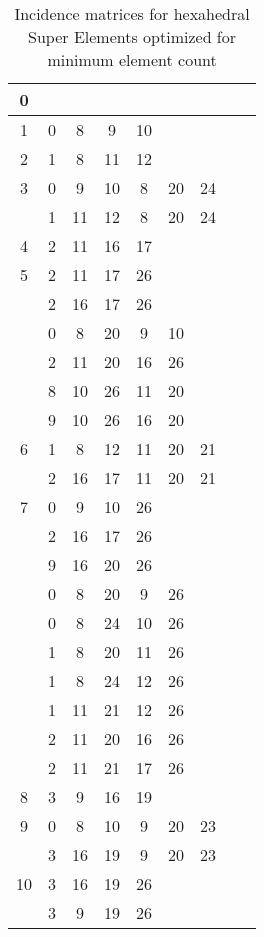 \begin{table}[H]
\centering
\caption{Incidence matrices for hexahedral Super Elements optimized for minimum element count}
\label{tab:inz_matricis_hex_minElements}
\begin{tabular}{|c|cccccccc|}\hline
0 & & & & & & & & \\
\hline
1  & 0 & 8 & 9 & 10 &   &   &   &  \\
\hline
2  & 1 & 8 & 11 & 12 &   &   &   &  \\
\hline
3  & 0 & 9 & 10 & 8 & 20 & 24 &   &  \\
 & 1 & 11 & 12 & 8 & 20 & 24 &   &  \\
\hline
4  & 2 & 11 & 16 & 17 &   &   &   &  \\
\hline
5  & 2 & 11 & 17 & 26 &   &   &   &  \\
 & 2 & 16 & 17 & 26 &   &   &   &  \\
 & 0 & 8 & 20 & 9 & 10 &   &   &  \\
 & 2 & 11 & 20 & 16 & 26 &   &   &  \\
 & 8 & 10 & 26 & 11 & 20 &   &   &  \\
 & 9 & 10 & 26 & 16 & 20 &   &   &  \\
\hline
6  & 1 & 8 & 12 & 11 & 20 & 21 &   &  \\
 & 2 & 16 & 17 & 11 & 20 & 21 &   &  \\
\hline
7  & 0 & 9 & 10 & 26 &   &   &   &  \\
 & 2 & 16 & 17 & 26 &   &   &   &  \\
 & 9 & 16 & 20 & 26 &   &   &   &  \\
 & 0 & 8 & 20 & 9 & 26 &   &   &  \\
 & 0 & 8 & 24 & 10 & 26 &   &   &  \\
 & 1 & 8 & 20 & 11 & 26 &   &   &  \\
 & 1 & 8 & 24 & 12 & 26 &   &   &  \\
 & 1 & 11 & 21 & 12 & 26 &   &   &  \\
 & 2 & 11 & 20 & 16 & 26 &   &   &  \\
 & 2 & 11 & 21 & 17 & 26 &   &   &  \\
\hline
8  & 3 & 9 & 16 & 19 &   &   &   &  \\
\hline
9  & 0 & 8 & 10 & 9 & 20 & 23 &   &  \\
 & 3 & 16 & 19 & 9 & 20 & 23 &   &  \\
\hline
10  & 3 & 16 & 19 & 26 &   &   &   &  \\
 & 3 & 9 & 19 & 26 &   &   &   &  \\

\end{tabular}
\end{table}
